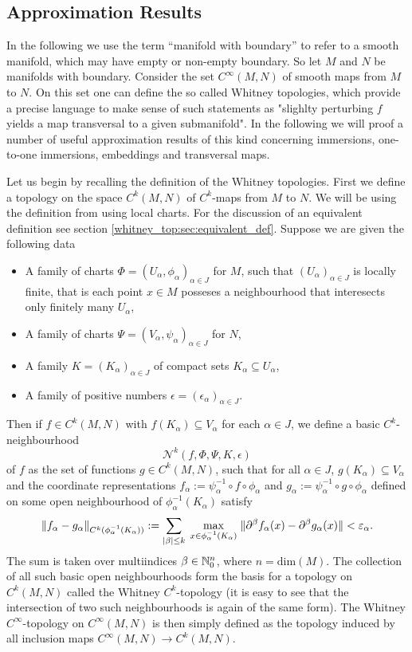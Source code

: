 \subsection{Approximation Results}
\label{whitney_top:sec:approx_results}


In the following we use the term ``manifold with boundary'' to refer to a smooth manifold, which may have empty or non-empty boundary. So let $M$ and $N$ be manifolds with boundary. Consider the set $C^\infty(M,N)$ of smooth maps from $M$ to $N$. On this set one can define the so called Whitney topologies, which provide a precise language to make sense of such statements as "slighlty perturbing $f$ yields a map transversal to a given submanifold". In the following we will proof a number of useful approximation results of this kind concerning immersions, one-to-one immersions, embeddings and transversal maps.

Let us begin by recalling the definition of the Whitney topologies. First we define a topology on the space $C^k(M,N)$ of $C^k$-maps from $M$ to $N$. We will be using the definition from \cite{hirsch2012differential} using local charts. For the discussion of an equivalent definition see section \ref{whitney_top:sec:equivalent_def}. Suppose we are given the following data
\begin{itemize}
    \item A family of charts $\Phi = (U_\alpha,\phi_\alpha)_{\alpha\in J}$ for $M$, such that $(U_\alpha)_{\alpha\in J}$ is locally finite, that is each point $x \in M$ posseses a neighbourhood that interesects only finitely many $U_\alpha$,
    \item A family of charts $\Psi = (V_\alpha,\psi_\alpha)_{\alpha \in J}$ for $N$,
    \item A family $K= (K_\alpha)_{\alpha \in J}$ of compact sets $K_\alpha \subseteq U_\alpha$,
    \item A family of positive numbers $\epsilon = (\epsilon_\alpha)_{\alpha \in J}$.
\end{itemize} 
Then if $f \in C^k(M,N)$ with $f(K_\alpha) \subseteq V_\alpha$ for each $\alpha \in J$, we define a basic $C^k$-neighbourhood
\[
\mathcal{N}^k(f,\Phi,\Psi,K,\epsilon)
\]
of $f$ as the set of functions $g \in C^k(M,N)$, such that for all $\alpha \in J$, $g(K_\alpha) \subseteq V_\alpha$ and the coordinate representations $f_\alpha := \psi_\alpha^{-1} \circ f\circ\phi_\alpha$ and $g_\alpha := \psi_\alpha^{-1} \circ g\circ\phi_\alpha$ defined on some open neighbourhood of $\phi_\alpha^{-1}(K_\alpha)$ satisfy 
\[
\lVert f_\alpha - g_\alpha\rVert_{C^k(\phi_\alpha^{-1}(K_\alpha))} := \sum_{\lvert\beta\rvert \leq k} \; \max_{x \in \phi_\alpha^{-1}(K_\alpha)} \; \lVert\partial^\beta f_\alpha(x) - \partial^\beta g_\alpha(x)\rVert < \varepsilon_\alpha.
\]
The sum is taken over multiindices $\beta \in \mathbb{N}_0^n$, where $n = \mathrm{dim}(M)$. The collection of all such basic open neighbourhoods form the basis for a topology on $C^k(M,N)$ called the Whitney $C^k$-topology (it is easy to see that the intersection of two such neighbourhoods is again of the same form). The Whitney $C^\infty$-topology on $C^\infty(M,N)$ is then simply defined as the topology induced by all inclusion maps $C^\infty(M,N) \to C^k(M,N)$. 

